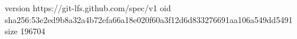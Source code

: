 version https://git-lfs.github.com/spec/v1
oid sha256:53e2ed9b8a32a4b72efa66a18e020f60a3f12d6d833276691aa106a549dd5491
size 196704

